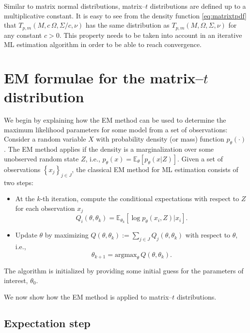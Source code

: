 \documentclass[english,listof=totoc]{scrartcl}
\begin{document}
Similar to matrix normal distributions, matrix--$t$ distributions are
defined up to a multiplicative constant. It is easy to see from the
density function \eqref{eq:matrixtpdf} that
$T_{p,m}(M,c\,\Omega,\Sigma/c,\nu)$ has the same distribution as
$T_{p,m}(M,\Omega,\Sigma,\nu)$ for any constant $c>0$. This property
needs to be taken into account in an iterative ML estimation algorithm
in order to be able to reach convergence.


\section{EM formulae for the matrix--$t$ distribution}\label{sec:EM}

We begin by explaining how the EM method can be used to determine the
maximum likelihood parameters for some model from a set of
observations: Consider a random variable $X$ with probability density
(or mass) function $p_{\theta}(\cdot)$. The EM method applies if the
density is a marginalization over some unobserved random state $Z$,
i.e., $p_{\theta}(x)=\mathbb{E}_{\theta}\left[p_{\theta}(x|Z)\right]$.
Given a set of observations $\left\{x_j\right\}_{j\in J}$, the
classical EM method for ML estimation consists of two steps:
%
\begin{itemize}
\item At the $k$-th iteration, compute the conditional expectations
	with respect to $Z$ for each observation $x_j$ \begin{equation}
Q_i(\theta,\theta_k)=\mathbb{E}_{\theta_k}\left[\log p_{\theta}(x_i,Z)|x_i\right].
\end{equation}

\item Update $\theta$ by maximizing $Q(\theta,\theta_k):=\sum_{j\in J}Q_j(\theta,\theta_k)$ with respect to $\theta$, i.e.,
\begin{equation}
\theta_{k+1} = \textrm{argmax}_{\theta}\,Q(\theta,\theta_k).
\end{equation}
\end{itemize}
The algorithm is initialized by providing some initial guess for the
parameters of interest, $\theta_0$.

We now show how the EM method is applied to matrix--$t$ distributions.

\subsection{Expectation step}
\end{document}

